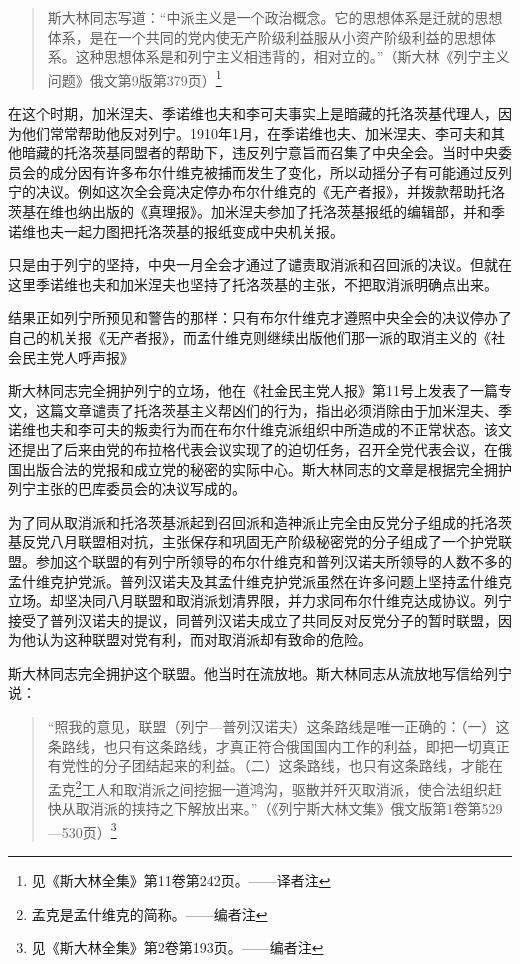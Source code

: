 \begin{quotation}
斯大林同志写道：“中派主义是一个政治概念。它的思想体系是迁就的思想体系，是在一个共同的党内使无产阶级利益服从小资产阶级利益的思想体系。这种思想体系是和列宁主义相违背的，相对立的。”（斯大林《列宁主义问题》俄文第9版第379页）\footnote{见《斯大林全集》第11卷第242页。——译者注}
\end{quotation}

在这个时期，加米涅夫、季诺维也夫和李可夫事实上是暗藏的托洛茨基代理人，因为他们常常帮助他反对列宁。1910年1月，在季诺维也夫、加米涅夫、李可夫和其他暗藏的托洛茨基同盟者的帮助下，违反列宁意旨而召集了中央全会。当时中央委员会的成分因有许多布尔什维克被捕而发生了变化，所以动摇分子有可能通过反列宁的决议。例如这次全会竟决定停办布尔什维克的《无产者报》，并拨款帮助托洛茨基在维也纳出版的《真理报》。加米涅夫参加了托洛茨基报纸的编辑部，并和季诺维也夫一起力图把托洛茨基的报纸变成中央机关报。

只是由于列宁的坚持，中央一月全会才通过了谴责取消派和召回派的决议。但就在这里季诺维也夫和加米涅夫也坚持了托洛茨基的主张，不把取消派明确点出来。

结果正如列宁所预见和警告的那样：只有布尔什维克才遵照中央全会的决议停办了自己的机关报《无产者报》，而孟什维克则继续出版他们那一派的取消主义的《社会民主党人呼声报》

斯大林同志完全拥护列宁的立场，他在《社金民主党人报》第11号上发表了一篇专文，这篇文章谴责了托洛茨基主义帮凶们的行为，指出必须消除由于加米涅夫、季诺维也夫和李可夫的叛卖行为而在布尔什维克派组织中所造成的不正常状态。该文还提出了后来由党的布拉格代表会议实现了的迫切任务，召开全党代表会议，在俄国出版合法的党报和成立党的秘密的实际中心。斯大林同志的文章是根据完全拥护列宁主张的巴库委员会的决议写成的。

为了同从取消派和托洛茨基派起到召回派和造神派止完全由反党分子组成的托洛茨基反党八月联盟相对抗，主张保存和巩固无产阶级秘密党的分子组成了一个护党联盟。参加这个联盟的有列宁所领导的布尔什维克和普列汉诺夫所领导的人数不多的孟什维克护党派。普列汉诺夫及其孟什维克护党派虽然在许多问题上坚持孟什维克立场。却坚决同八月联盟和取消派划清界限，并力求同布尔什维克达成协议。列宁接受了普列汉诺夫的提议，同普列汉诺夫成立了共同反对反党分子的暂时联盟，因为他认为这种联盟对党有利，而对取消派却有致命的危险。

斯大林同志完全拥护这个联盟。他当时在流放地。斯大林同志从流放地写信给列宁说：

\begin{quotation}
“照我的意见，联盟（列宁—普列汉诺夫）这条路线是唯一正确的：（一）这条路线，也只有这条路线，才真正符合俄国国内工作的利益，即把一切真正有党性的分子团结起来的利益。（二）这条路线，也只有这条路线，才能在孟克\footnote{孟克是孟什维克的简称。——编者注}工人和取消派之间挖掘一道鸿沟，驱散并歼灭取消派，使合法组织赶快从取消派的挟持之下解放出来。”（《列宁斯大林文集》俄文版第1卷第529—530页）\footnote{见《斯大林全集》第2卷第193页。——编者注}
\end{quotation}

